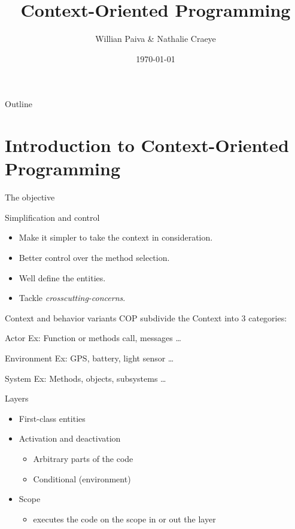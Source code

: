 \documentclass[presentation]{beamer}
\author{Willian Paiva \& Nathalie Craeye}
\date{\today}
\title{Context-Oriented Programming}
\begin{document}
\maketitle
\begin{frame}{Outline}
\tableofcontents
\end{frame}


\section{Introduction to Context-Oriented Programming}
\label{sec:org7ce1743}

\begin{frame}[label={sec:org0c3eb62}]{The objective}
\begin{block}{Simplification and control}
\begin{itemize}
\item Make it simpler to take the context in consideration.
\item Better control over the method selection.
\item Well define the entities.
\item Tackle \emph{crosscutting-concerns}.
\end{itemize}
\end{block}
\end{frame}



\begin{frame}[label={sec:orgdd9ced6}]{Context and behavior variants}
COP subdivide the Context into 3 categories:
\begin{block}{Actor}
Ex: Function or methods call, messages \ldots{}
\end{block}
\begin{block}{Environment}
Ex: GPS, battery, light sensor \ldots{} 
\end{block}
\begin{block}{System}
Ex: Methods, objects, subsystems \ldots{}
\end{block}
\end{frame}

\begin{frame}[label={sec:orgb963529}]{Layers}
\begin{itemize}
\item First-class entities
\item Activation and deactivation
\begin{itemize}
\item Arbitrary parts of the code
\item Conditional (environment)
\end{itemize}
\item Scope
\begin{itemize}
\item executes the code on the scope in or out the layer
\end{itemize}
\end{itemize}
\end{frame}
\end{document}
